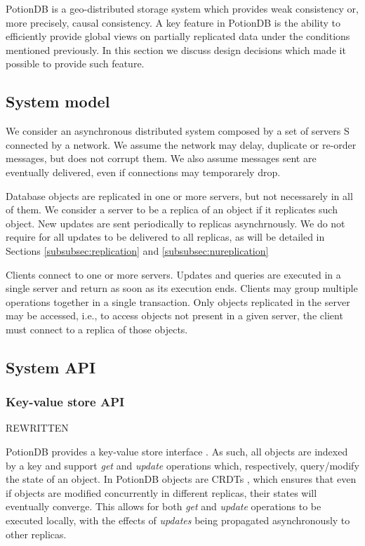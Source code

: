 \documentclass{vldb}
\newcommand{\grumbler}[2]{{\color{red}{\bf #1:} #2}}
\newcommand{\andre}[1]{\grumbler{andre}{#1}}
\begin{document}
PotionDB is a geo-distributed storage system which provides weak consistency or, more precisely, causal consistency.
A key feature in PotionDB is the ability to efficiently provide global views on partially replicated data under the conditions mentioned previously.
In this section we discuss design decisions which made it possible to provide such feature.

\subsection{System model}

We consider an asynchronous distributed system composed by a set of servers S connected by a network. 
We assume the network may delay, duplicate or re-order messages, but does not corrupt them. 
We also assume messages sent are eventually delivered, even if connections may temporarely drop.

Database objects are replicated in one or more servers, but not necessarely in all of them.  
We consider a server to be a replica of an object if it replicates such object. 
New updates are sent periodically to replicas asynchrnously. 
We do not require for all updates to be delivered to all replicas, as will be detailed in Sections \ref{subsubsec:replication} and \ref{subsubsec:nureplication}

Clients connect to one or more servers. 
Updates and queries are executed in a single server and return as soon as its execution ends.
Clients may group multiple operations together in a single transaction.
Only objects replicated in the server may be accessed, i.e., to access objects not present in a given server, the client must connect to a replica of those objects.

\subsection{System API}

\subsubsection{Key-value store API}
\andre{REWRITTEN}

PotionDB provides a key-value store interface \cite{???}.
As such, all objects are indexed by a key and support \emph{get} and \emph{update} operations which, respectively, query/modify the state of an object.
In PotionDB objects are CRDTs \cite{crdt}, which ensures that even if objects are modified concurrently in different replicas, their states will eventually converge.
This allows for both \emph{get} and \emph{update} operations to be executed locally, with the effects of \emph{updates} being propagated asynchronously to other replicas.
\end{document}

